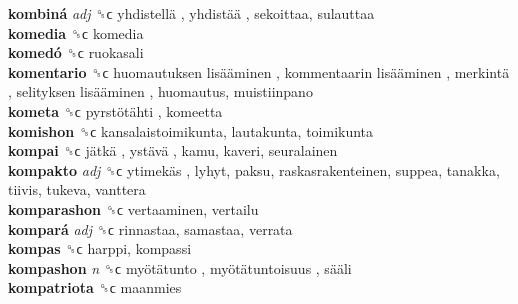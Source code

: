 \textbf{kombiná} \emph{adj}  ␝ϲ   yhdistellä ,  yhdistää , sekoittaa, sulauttaa  \\
\textbf{komedia} ␝ϲ  komedia  \\
\textbf{komedó} ␝ϲ  ruokasali  \\
\textbf{komentario} ␝ϲ   huomautuksen lisääminen ,  kommentaarin lisääminen ,  merkintä ,  selityksen lisääminen , huomautus, muistiinpano  \\
\textbf{kometa} ␝ϲ   pyrstötähti , komeetta  \\
\textbf{komishon} ␝ϲ  kansalaistoimikunta, lautakunta, toimikunta  \\
\textbf{kompai} ␝ϲ   jätkä ,  ystävä , kamu, kaveri, seuralainen  \\
\textbf{kompakto} \emph{adj}  ␝ϲ   ytimekäs , lyhyt, paksu, raskasrakenteinen, suppea, tanakka, tiivis, tukeva, vanttera  \\
\textbf{komparashon} ␝ϲ  vertaaminen, vertailu  \\
\textbf{kompará} \emph{adj}  ␝ϲ  rinnastaa, samastaa, verrata  \\
\textbf{kompas} ␝ϲ  harppi, kompassi  \\
\textbf{kompashon} \emph{n}  ␝ϲ   myötätunto ,  myötätuntoisuus ,  sääli   \\
\textbf{kompatriota} ␝ϲ  maanmies  \\

